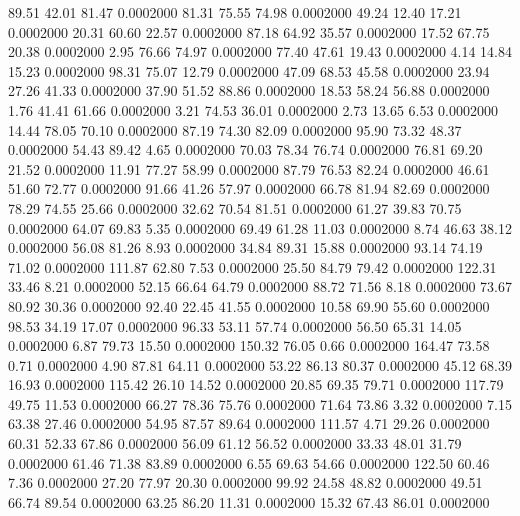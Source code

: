   89.51   42.01   81.47   0.0002000
  81.31   75.55   74.98   0.0002000
  49.24   12.40   17.21   0.0002000
  20.31   60.60   22.57   0.0002000
  87.18   64.92   35.57   0.0002000
  17.52   67.75   20.38   0.0002000
   2.95   76.66   74.97   0.0002000
  77.40   47.61   19.43   0.0002000
   4.14   14.84   15.23   0.0002000
  98.31   75.07   12.79   0.0002000
  47.09   68.53   45.58   0.0002000
  23.94   27.26   41.33   0.0002000
  37.90   51.52   88.86   0.0002000
  18.53   58.24   56.88   0.0002000
   1.76   41.41   61.66   0.0002000
   3.21   74.53   36.01   0.0002000
   2.73   13.65    6.53   0.0002000
  14.44   78.05   70.10   0.0002000
  87.19   74.30   82.09   0.0002000
  95.90   73.32   48.37   0.0002000
  54.43   89.42    4.65   0.0002000
  70.03   78.34   76.74   0.0002000
  76.81   69.20   21.52   0.0002000
  11.91   77.27   58.99   0.0002000
  87.79   76.53   82.24   0.0002000
  46.61   51.60   72.77   0.0002000
  91.66   41.26   57.97   0.0002000
  66.78   81.94   82.69   0.0002000
  78.29   74.55   25.66   0.0002000
  32.62   70.54   81.51   0.0002000
  61.27   39.83   70.75   0.0002000
  64.07   69.83    5.35   0.0002000
  69.49   61.28   11.03   0.0002000
   8.74   46.63   38.12   0.0002000
  56.08   81.26    8.93   0.0002000
  34.84   89.31   15.88   0.0002000
  93.14   74.19   71.02   0.0002000
 111.87   62.80    7.53   0.0002000
  25.50   84.79   79.42   0.0002000
 122.31   33.46    8.21   0.0002000
  52.15   66.64   64.79   0.0002000
  88.72   71.56    8.18   0.0002000
  73.67   80.92   30.36   0.0002000
  92.40   22.45   41.55   0.0002000
  10.58   69.90   55.60   0.0002000
  98.53   34.19   17.07   0.0002000
  96.33   53.11   57.74   0.0002000
  56.50   65.31   14.05   0.0002000
   6.87   79.73   15.50   0.0002000
 150.32   76.05    0.66   0.0002000
 164.47   73.58    0.71   0.0002000
   4.90   87.81   64.11   0.0002000
  53.22   86.13   80.37   0.0002000
  45.12   68.39   16.93   0.0002000
 115.42   26.10   14.52   0.0002000
  20.85   69.35   79.71   0.0002000
 117.79   49.75   11.53   0.0002000
  66.27   78.36   75.76   0.0002000
  71.64   73.86    3.32   0.0002000
   7.15   63.38   27.46   0.0002000
  54.95   87.57   89.64   0.0002000
 111.57    4.71   29.26   0.0002000
  60.31   52.33   67.86   0.0002000
  56.09   61.12   56.52   0.0002000
  33.33   48.01   31.79   0.0002000
  61.46   71.38   83.89   0.0002000
   6.55   69.63   54.66   0.0002000
 122.50   60.46    7.36   0.0002000
  27.20   77.97   20.30   0.0002000
  99.92   24.58   48.82   0.0002000
  49.51   66.74   89.54   0.0002000
  63.25   86.20   11.31   0.0002000
  15.32   67.43   86.01   0.0002000

